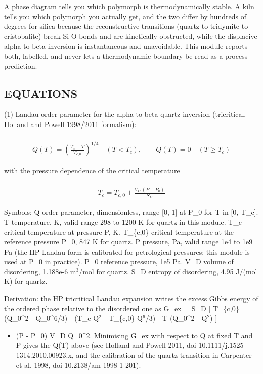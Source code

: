 \documentclass[10pt,a4paper,twoside]{report}
\begin{document}
A phase diagram tells you which polymorph is thermodynamically stable. A kiln tells you which polymorph you actually get, and the two differ by hundreds of degrees for silica because the reconstructive transitions (quartz to tridymite to cristobalite) break Si-O bonds and are kinetically obstructed, while the displacive alpha to beta inversion is instantaneous and unavoidable. This module reports both, labelled, and never lets a thermodynamic boundary be read as a process prediction.

\subsection*{EQUATIONS}

(1) Landau order parameter for the alpha to beta quartz inversion (tricritical, Holland and Powell 1998/2011 formalism):

\begin{equation*}
\begin{gathered}
\\ Q(T) = \left(\frac{T_c - T}{T_{c,0}}\right)^{1/4} \quad (T < T_c), \qquad Q(T) = 0 \quad (T \ge T_c)
\end{gathered}
\end{equation*}

with the pressure dependence of the critical temperature

\begin{equation*}
\begin{gathered}
\\ T_c = T_{c,0} + \frac{V_D\,(P - P_0)}{S_D}
\end{gathered}
\end{equation*}

Symbols: Q          order parameter, dimensionless, range [0, 1] at P\_0 for T in [0, T\_c]. T          temperature, K, valid range 298 to 1200 K for quartz in this module. T\_c        critical temperature at pressure P, K. T\_\{c,0\}    critical temperature at the reference pressure P\_0, 847 K for quartz. P          pressure, Pa, valid range 1e4 to 1e9 Pa (the HP Landau form is calibrated for petrological pressures; this module is used at P\_0 in practice). P\_0        reference pressure, 1e5 Pa. V\_D        volume of disordering, 1.188e-6 m$^{3}$/mol for quartz. S\_D        entropy of disordering, 4.95 J/(mol K) for quartz.

Derivation: the HP tricritical Landau expansion writes the excess Gibbs energy of the ordered phase relative to the disordered one as G\_ex = S\_D [ T\_\{c,0\}(Q\_0\textasciicircum{}2 - Q\_0\textasciicircum{}6/3) - (T\_c Q$^{2}$ - T\_\{c,0\} Q$^{6}$/3) - T (Q\_0\textasciicircum{}2 - Q$^{2}$) ]
\begin{itemize}
\item (P - P\_0) V\_D Q\_0\textasciicircum{}2. Minimising G\_ex with respect to Q at fixed T and P gives the
Q(T) above (see Holland and Powell 2011, doi 10.1111/j.1525-1314.2010.00923.x, and the calibration of the quartz transition in Carpenter et al. 1998, doi 10.2138/am-1998-1-201).
\end{itemize}
\end{document}
